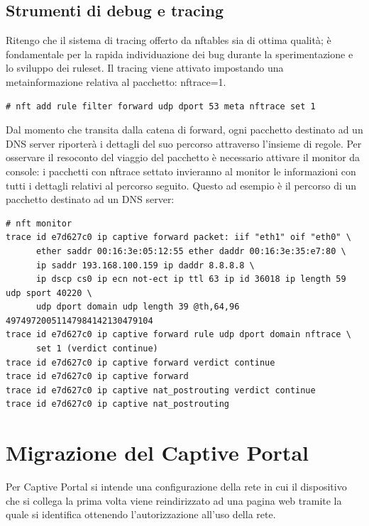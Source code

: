 \section{Strumenti di debug e tracing}
Ritengo che il sistema di tracing offerto da nftables sia di ottima qualit\`a;
\`e fondamentale per la rapida individuazione dei bug durante la
sperimentazione e lo sviluppo dei ruleset.
Il tracing viene attivato impostando una metainformazione relativa al pacchetto: nftrace=1.
\begin{lstlisting}[style=customb]
# nft add rule filter forward udp dport 53 meta nftrace set 1
\end{lstlisting}
Dal momento che transita dalla catena di forward, ogni pacchetto destinato ad un DNS server riporter\`a
i dettagli del suo percorso attraverso l'insieme di regole.
Per osservare il resoconto del viaggio del pacchetto \`e necessario attivare il
monitor da console: i pacchetti con nftrace settato invieranno al monitor le informazioni
con tutti i dettagli relativi al percorso seguito.
Questo ad esempio \`e il percorso di un pacchetto destinato ad un DNS server:
\begin{lstlisting}[style=customb]
# nft monitor
trace id e7d627c0 ip captive forward packet: iif "eth1" oif "eth0" \
      ether saddr 00:16:3e:05:12:55 ether daddr 00:16:3e:35:e7:80 \
      ip saddr 193.168.100.159 ip daddr 8.8.8.8 \
      ip dscp cs0 ip ecn not-ect ip ttl 63 ip id 36018 ip length 59 udp sport 40220 \
      udp dport domain udp length 39 @th,64,96 49749720051147984142130479104
trace id e7d627c0 ip captive forward rule udp dport domain nftrace \
      set 1 (verdict continue)
trace id e7d627c0 ip captive forward verdict continue
trace id e7d627c0 ip captive forward
trace id e7d627c0 ip captive nat_postrouting verdict continue
trace id e7d627c0 ip captive nat_postrouting
\end{lstlisting}

\chapter{Migrazione del Captive Portal}


Per Captive Portal si intende una configurazione della rete in cui il
dispositivo che si collega la prima volta viene reindirizzato ad una pagina web
tramite la quale si identifica ottenendo l'autorizzazione all'uso della rete.

